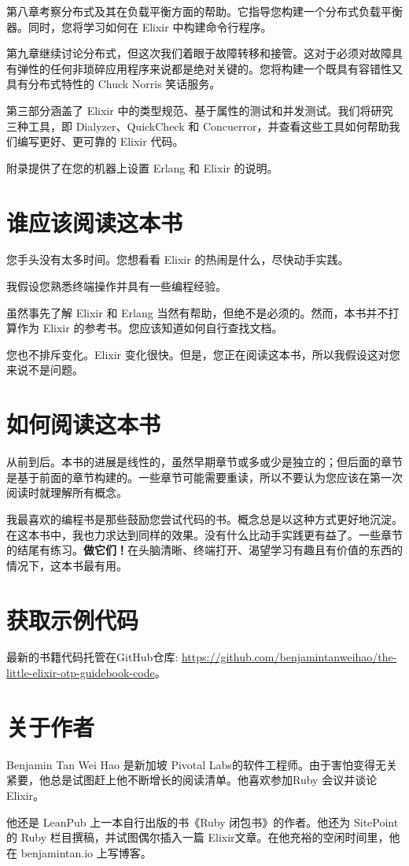 第八章考察分布式及其在负载平衡方面的帮助。它指导您构建一个分布式负载平衡器。同时，您将学习如何在
Elixir 中构建命令行程序。

第九章继续讨论分布式，但这次我们着眼于故障转移和接管。这对于必须对故障具有弹性的任何非琐碎应用程序来说都是绝对关键的。您将构建一个既具有容错性又具有分布式特性的
Chuck Norris 笑话服务。

第三部分涵盖了 Elixir
中的类型规范、基于属性的测试和并发测试。我们将研究三种工具，即
Dialyzer、QuickCheck 和
Concuerror，并查看这些工具如何帮助我们编写更好、更可靠的 Elixir 代码。

附录提供了在您的机器上设置 Erlang 和 Elixir 的说明。

\section*{谁应该阅读这本书}

您手头没有太多时间。您想看看 Elixir 的热闹是什么，尽快动手实践。

我假设您熟悉终端操作并具有一些编程经验。

虽然事先了解 Elixir 和 Erlang
当然有帮助，但绝不是必须的。然而，本书并不打算作为 Elixir
的参考书。您应该知道如何自行查找文档。

您也不排斥变化。Elixir
变化很快。但是，您正在阅读这本书，所以我假设这对您来说不是问题。

\section*{如何阅读这本书}

从前到后。本书的进展是线性的，虽然早期章节或多或少是独立的；但后面的章节是基于前面的章节构建的。一些章节可能需要重读，所以不要认为您应该在第一次阅读时就理解所有概念。

我最喜欢的编程书是那些鼓励您尝试代码的书。概念总是以这种方式更好地沉淀。在这本书中，我也力求达到同样的效果。没有什么比动手实践更有益了。一些章节的结尾有练习。\textbf{做它们！}在头脑清晰、终端打开、渴望学习有趣且有价值的东西的情况下，这本书最有用。

\section*{获取示例代码}

最新的书籍代码托管在GitHub仓库: \url{https://github.com/benjamintanweihao/the-little-elixir-otp-guidebook-code}。

\section*{关于作者}

Benjamin Tan Wei Hao 是新加坡 Pivotal Labs的软件工程师。由于害怕变得无关紧要，他总是试图赶上他不断增长的阅读清单。他喜欢参加Ruby 会议并谈论 Elixir。

他还是 LeanPub 上一本自行出版的书《Ruby 闭包书》的作者。他还为 SitePoint的 Ruby 栏目撰稿，并试图偶尔插入一篇 Elixir文章。在他充裕的空闲时间里，他在 benjamintan.io 上写博客。
